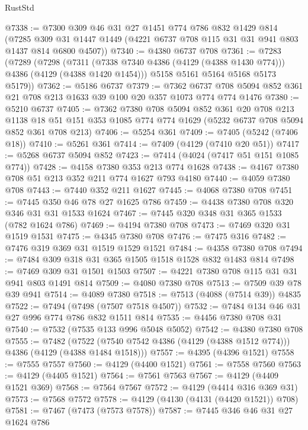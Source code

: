 \begin{lexlean}{RustStd}
\begin{coremodule}
{\begin{coremodule}
{{{{{{{{{{{{{{@7338 := @7300
    @309
    @46
    @31
    @27
    @1451
    @774
    @786
    @832
    @1429
    @814
    (@7285 @309 @31 @1447 @1449 (@4221 @6737 @708 @115 @31 @31 @941 @803 @1437 @814 @6800 @4507))
@7340 := @4380 @6737 @708
@7361 := @7283
    (@7289
      (@7298
        (@7311 (@7338 @7340 @4386 (@4129 (@4388 @1430 @774))) @4386 (@4129 (@4388 @1420 @1454)))
        @5158
        @5161
        @5164
        @5168
        @5173
        @5179))
@7362 := @5186 @6737
@7379 := @7362
    @6737
    @708
    @5094
    @852
    @361
    @21
    @708
    @213
    @1633
    @39
    @100
    @20
    @357
    @1073
    @774
    @774
    @1476
@7380 := @5210 @6737
@7405 := @7362
    @7380
    @708
    @5094
    @852
    @361
    @20
    @708
    @213
    @1138
    @18
    @51
    @151
    @353
    @1085
    @774
    @774
    @1629
    (@5232 @6737 @708 @5094 @852 @361 @708 @213)
@7406 := @5254 @361
@7409 := @7405 (@5242 (@7406 @18))
@7410 := @5261 @361
@7414 := @7409 (@4129 (@7410 @20 @51))
@7417 := @5268 @6737 @5094 @852
@7423 := @7414 (@4024 (@7417 @51 @151 @1085 @774))
@7428 := @4158 @7380 @353 @213 @774 @1628
@7438 := @4167 @7380 @708 @51 @213 @352 @211 @774 @1627 @793 @4180
@7440 := @4059 @7380 @708
@7443 := @7440 @352 @211 @1627
@7445 := @4068 @7380 @708
@7451 := @7445 @350 @46 @78 @27 @1625 @786
@7459 := @4438 @7380 @708 @320 @346 @31 @31 @1533 @1624
@7467 := @7445 @320 @348 @31 @365 @1533 (@782 @1624 @786)
@7469 := @4194 @7380 @708
@7473 := @7469 @320 @31 @1519 @1531
@7475 := @4345 @7380 @708
@7476 := @7475 @316
@7482 := @7476 @319 @369 @31 @1519 @1529 @1521
@7484 := @4358 @7380 @708
@7494 := @7484 @309 @318 @31 @365 @1505 @1518 @1528 @832 @1483 @814
@7498 := @7469 @309 @31 @1501 @1503
@7507 := @4221 @7380 @708 @115 @31 @31 @941 @803 @1491 @814
@7509 := @4080 @7380 @708
@7513 := @7509 @39 @78 @39 @941
@7514 := @4089 @7380
@7518 := @7513 (@4088 (@7514 @39)) @4835
@7522 := @7494 (@7498 (@7507 @7518 @4507))
@7532 := @7484 @134 @46 @31 @27 @996 @774 @786 @832 @1511 @814
@7535 := @4456 @7380 @708 @31
@7540 := @7532 (@7535 @133 @996 @5048 @5052)
@7542 := @4380 @7380 @708
@7555 := @7482
    (@7522 (@7540 @7542 @4386 (@4129 (@4388 @1512 @774))) @4386 (@4129 (@4388 @1484 @1518)))
@7557 := @4395 (@4396 @1521)
@7558 := @7555 @7557
@7560 := @4129 (@4400 @1521)
@7561 := @7558 @7560
@7563 := @4129 (@4405 @1521)
@7564 := @7561 @7563
@7567 := @4129 (@4409 @1521 @369)
@7568 := @7564 @7567
@7572 := @4129 (@4414 @316 @369 @31)
@7573 := @7568 @7572
@7578 := @4129 (@4130 (@4131 (@4420 @1521)) @708)
@7581 := @7467 (@7473 (@7573 @7578))
@7587 := @7445 @346 @46 @31 @27 @1624 @786
}}}}}}}}}}}}}}
\end{coremodule}}
\end{coremodule}
\end{lexlean}
